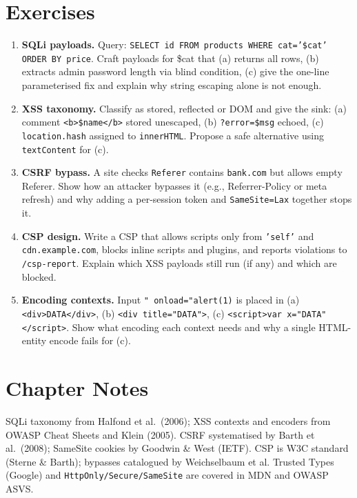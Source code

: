 \section{Exercises}
\label{sec:ch03-exercises}
{\sloppy
\begin{enumerate}[label=E3.\arabic*, leftmargin=*, itemsep=0.6em]
    \item \textbf{SQLi payloads.} Query: \texttt{SELECT id FROM products WHERE cat='\$cat' ORDER BY price}. Craft payloads for \$cat that (a) returns all rows, (b) extracts admin password length via blind condition, (c) give the one-line parameterised fix and explain why string escaping alone is not enough.
    \item \textbf{XSS taxonomy.} Classify as stored, reflected or DOM and give the sink: (a) comment \texttt{<b>\$name</b>} stored unescaped, (b) \texttt{?error=\$msg} echoed, (c) \texttt{location.hash} assigned to \texttt{innerHTML}. Propose a safe alternative using \texttt{textContent} for (c).
    \item \textbf{CSRF bypass.} A site checks \texttt{Referer} contains \texttt{bank.com} but allows empty Referer. Show how an attacker bypasses it (e.g., Referrer-Policy or meta refresh) and why adding a per-session token and \texttt{SameSite=Lax} together stops it.
    \item \textbf{CSP design.} Write a CSP that allows scripts only from \texttt{'self'} and \texttt{cdn.example.com}, blocks inline scripts and plugins, and reports violations to \texttt{/csp-report}. Explain which XSS payloads still run (if any) and which are blocked.
    \item \textbf{Encoding contexts.} Input \texttt{" onload="alert(1)} is placed in (a) \texttt{<div>DATA</div>}, (b) \texttt{<div title="DATA">}, (c) \texttt{<script>var x="DATA"</script>}. Show what encoding each context needs and why a single HTML-entity encode fails for (c).
\end{enumerate}
\par}

\section*{Chapter Notes}
SQLi taxonomy from Halfond et al.~(2006); XSS contexts and encoders from OWASP Cheat Sheets and Klein (2005). CSRF systematised by Barth et al.~(2008); SameSite cookies by Goodwin \& West (IETF). CSP is W3C standard (Sterne \& Barth); bypasses catalogued by Weichselbaum et al. Trusted Types (Google) and \texttt{HttpOnly/Secure/SameSite} are covered in MDN and OWASP ASVS.

